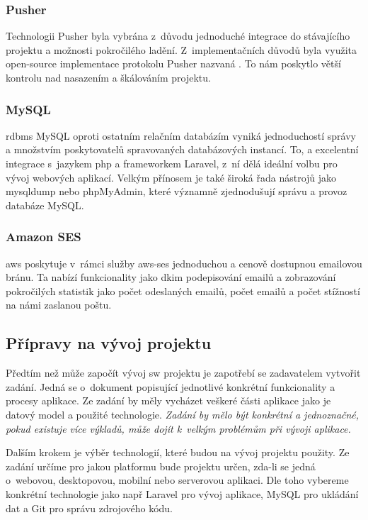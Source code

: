 \subsubsection{Pusher}

Technologii Pusher byla vybrána z~důvodu jednoduché integrace do stávajícího projektu a možnosti pokročilého ladění. Z~implementačních důvodů byla využita \gls{open-source} implementace protokolu Pusher nazvaná . To nám poskytlo větší kontrolu nad nasazením a škálováním projektu.

\subsubsection{MySQL}

\acrshort{rdbms} MySQL oproti ostatním relačním databázím vyniká jednoduchostí správy a množstvím poskytovatelů spravovaných databázových instancí\cite{mysql-vs-others}. To, a excelentní integrace s~jazykem \acrshort{php} a \gls{framework}em Laravel, z~ní dělá ideální volbu pro vývoj webových aplikací. Velkým přínosem je také široká řada nástrojů jako mysqldump\cite{mysqldump} nebo phpMyAdmin\cite{phpmyadmin}, které významně zjednodušují správu a provoz databáze MySQL.

\subsubsection{Amazon SES}

\acrfull{aws} poskytuje v~rámci služby \acrfull{aws-ses} jednoduchou a cenově dostupnou emailovou bránu. Ta nabízí funkcionality jako \gls{dkim} podepisování emailů a zobrazování pokročilých statistik jako počet odeslaných emailů, počet  emailů\cite{email-bounce} a počet stížností na námi zaslanou poštu.

\subsection{Přípravy na vývoj projektu}

Předtím než může započít vývoj \acrshort{sw} projektu je zapotřebí se zadavatelem vytvořit zadání. Jedná se o~dokument popisující jednotlivé konkrétní funkcionality a procesy aplikace. Ze zadání by měly vycházet veškeré části aplikace jako je datový model a použité technologie. \emph{Zadání by mělo být konkrétní a jednoznačné, pokud existuje více výkladů, může dojít k~velkým problémům při vývoji aplikace.} 

Dalším krokem je výběr technologií, které budou na vývoj projektu použity. Ze zadání určíme pro jakou platformu bude projektu určen, zda-li se jedná o~webovou, desktopovou, mobilní nebo serverovou aplikaci. Dle toho vybereme konkrétní technologie jako např Laravel\cite{laravel} pro vývoj aplikace, MySQL\cite{mysql} pro ukládání dat a Git\cite{git} pro správu zdrojového kódu.

